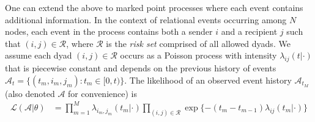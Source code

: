\documentclass{article}
\begin{document}

One can extend the above to marked point processes where each event contains additional information.  In the context of relational events occurring among $N$ nodes, each event in the process contains both a sender $i$ and a recipient $j$ such that  $(i,j) \in \mathcal{R}$, where $\mathcal{R}$ is the \emph{risk set} comprised of all allowed dyads.  We assume each dyad $(i,j) \in \mathcal{R}$ occurs as a Poisson process with intensity $\lambda_{ij}(t|\cdot)$ that is piecewise constant and depends on the previous history of events  $\mathcal{A}_t = \{(t_m,i_m,j_m): t_m \in [0,t) \}$.  The likelihood of an observed event history $\mathcal{A}_{t_M}$ (also denoted $\mathcal{A}$ for convenience) is
\begin{align}
\mathcal{L}(\mathcal{A}|\theta) &= \prod_{m=1}^M \lambda_{i_m,j_m}(t_m|\cdot) \prod_{(i,j) \in \mathcal{R}}\exp\{ - (t_m - t_{m-1}) \lambda_{ij}(t_m | \cdot) \}
\label{eqn:llk}
\end{align}


\end{document}
